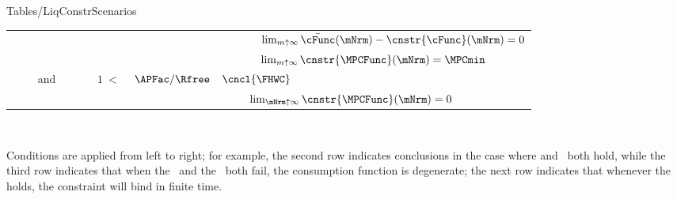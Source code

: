 \documentclass[\econtexRoot/BufferStockTheory]{subfiles}
\begin{document}
\begin{verbatimwrite}{Tables/LiqConstrScenarios}
\begin{table}[b]
{\begin{tabular}{|l|rcl|l|}
          \\ ~~~~               &                          &                             &                          & ~~~~~~~$\lim_{m \uparrow \infty}\bar{\cFunc}(\mNrm) - \cnstr{\cFunc}(\mNrm) = 0$ %
          \\ ~~~~               &                          &                             &                          & ~~~~~~~$\lim_{m \uparrow \infty}\cnstr{\MPCFunc}(\mNrm) = \MPCmin$ %
          \\ ~~~~ and \cncl{\RIC}   &                          & $\phantom{~<~}1         ~<~ $ & $         \APFac/\Rfree$ & $\cncl{\FHWC}$
          \\ ~~~~~~             &                          &                             &                          & ~~~~~$\lim_{\mNrm \uparrow \infty} \cnstr{\MPCFunc}(\mNrm) =  0$               %
          \\ \hline
        \end{tabular}
      } %

      \settowidth\TableWidth{\usebox{\LiqConstrScenarios}}
      \usebox{\LiqConstrScenarios}
      \\ \medskip 
      \parbox{\TableWidth}{\raggedright \footnotesize Conditions are applied from left to right; for example, the second row indicates conclusions in the case where \cncl{\GICRaw} and \RIC~both hold, while the third row indicates that when the \GICRaw~and the \RIC~both fail, the consumption function is degenerate; the next row indicates that whenever the {\GICRaw} holds, the constraint will bind in finite time.}

    \end{table}


  \end{verbatimwrite}
  \clearpage
  
\end{document}
